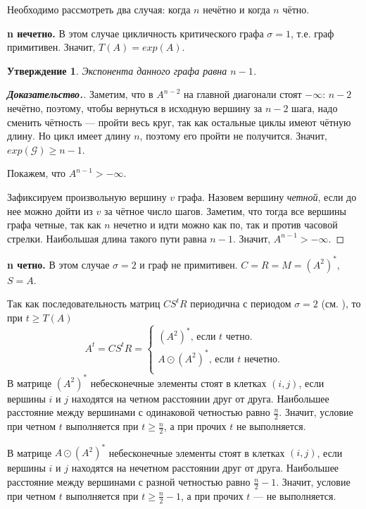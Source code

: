 \documentclass[12pt]{article}
\newtheorem{proposition}[theorem]{Утверждение}
\begin{document}
Необходимо рассмотреть два случая: когда $n$ нечётно и когда $n$ чётно.

\textbf{n нечетно.} В этом случае цикличность критического графа $\sigma = 1$, т.е. граф примитивен. Значит, $T(A) = exp(A)$.

\begin{proposition}
Экспонента данного графа равна $n - 1$.
\end{proposition}
\begin{proof}[\textbf{Доказательство.}]
Заметим, что в $A^{n - 2}$ на главной диагонали стоят $-\infty$: $n - 2$ нечётно, поэтому, чтобы вернуться в исходную вершину за $n - 2$ шага, надо сменить чётность --- пройти весь круг, так как остальные циклы имеют чётную длину. Но цикл имеет длину $n$, поэтому его пройти не получится. Значит, $exp(\mathcal{G}) \ge n - 1$.

Покажем, что $A^{n - 1} > -\infty$.

Зафиксируем произвольную вершину $v$ графа. Назовем вершину \textit{четной}, если до нее можно дойти из $v$ за чётное число шагов. Заметим, что тогда все вершины графа четные, так как $n$ нечетно и идти можно как по, так и против часовой стрелки. Наибольшая длина такого пути равна $n - 1$. Значит, $A^{n - 1} > -\infty$.
\end{proof}

\textbf{n четно.} В этом случае $\sigma = 2$ и граф не примитивен. $C = R = M = (A^2)^*$, $S = A$.

Так как последовательность матриц $CS^tR$ периодична с периодом $\sigma = 2$ (см. \cite{15WeakCSRExpantion}), то при $t \ge T(A)$ \begin{equation*}
A^t = CS^tR = \begin{cases}
(A^2)^* \text{, если } t \text{ четно.}\\
A \odot (A^2)^*\text{, если } t \text{ нечетно.}\\
\end{cases}
\end{equation*}
В матрице $(A^2)^*$ небесконечные элементы стоят в клетках $(i, j)$, если вершины $i$ и $j$ находятся на четном расстоянии друг от друга. Наибольшее расстояние между вершинами с одинаковой четностью равно $\frac{n}{2}$. Значит, условие при четном $t$ выполняется при $t \ge \frac{n}{2}$, а при прочих $t$ не выполняется.

В матрице $A\odot(A^2)^*$ небесконечные элементы стоят в клетках $(i, j)$, если вершины $i$ и $j$ находятся на нечетном расстоянии друг от друга. Наибольшее расстояние между вершинами с разной четностью равно $\frac{n}{2} - 1$. Значит, условие при четном $t$ выполняется при $t \ge \frac{n}{2} - 1$, а при прочих $t$ --- не выполняется.
\end{document}
